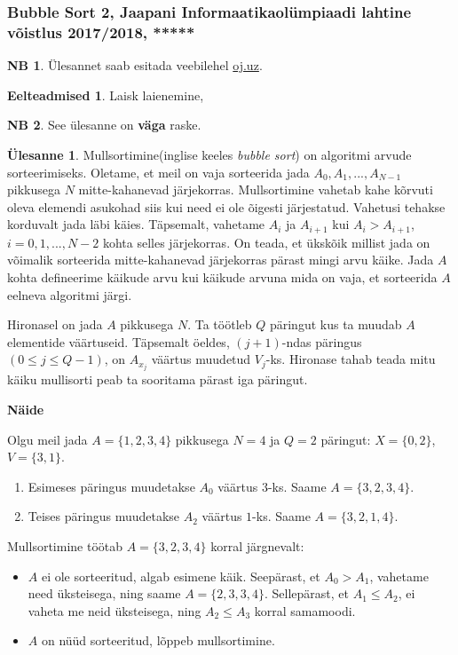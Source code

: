 \documentclass{trkut}
\theoremstyle{definition}
\newtheorem*{prereq}{Eelteadmised}
\newtheorem*{extra}{NB}
\newtheorem*{Text}{Ülesanne}
\begin{document}
\subsubsection{Bubble Sort 2, Jaapani Informaatikaolümpiaadi lahtine võistlus 2017/2018,  *****}
\begin{extra}
Ülesannet saab esitada veebilehel \href{https://oj.uz/problem/view/JOI18_bubblesort2}{oj.uz}.
\end{extra}
\begin{prereq}
Laisk laienemine,
\end{prereq}
\begin{extra}
See ülesanne on \textbf{väga} raske.
\end{extra}
\begin{Text}
Mullsortimine(inglise keeles \textit{bubble sort}) on algoritmi arvude sorteerimiseks. Oletame, et meil on vaja sorteerida jada $A_0,A_1,...,A_{N-1}$ pikkusega $N$ mitte-kahanevad järjekorras. Mullsortimine vahetab kahe kõrvuti oleva elemendi asukohad siis kui need ei ole õigesti järjestatud. Vahetusi tehakse korduvalt jada läbi käies. Täpsemalt, vahetame $A_i$ ja $A_{i+1}$ kui $A_i>A_{i+1}$, $i=0,1,...,N-2$ kohta selles järjekorras. On teada, et ükskõik millist jada on võimalik sorteerida mitte-kahanevad järjekorras pärast mingi arvu käike. Jada $A$ kohta defineerime käikude arvu kui käikude arvuna mida on vaja, et sorteerida $A$ eelneva algoritmi järgi.

Hironasel on jada $A$ pikkusega $N$. Ta töötleb $Q$ päringut kus ta muudab $A$ elementide väärtuseid. Täpsemalt öeldes, $(j+1)$-ndas päringus$(0\le j\le Q-1)$, on $A_{x_j}$ väärtus muudetud $V_j$-ks.
Hironase tahab teada mitu käiku mullisorti peab ta sooritama pärast iga päringut.

\textbf{Näide}

Olgu meil jada $A=\{1,2,3,4\}$ pikkusega $N=4$ ja $Q=2$ päringut: $X=\{0,2\}$, $V=\{3,1\}$.
\begin{enumerate}
    \item Esimeses päringus muudetakse $A_0$ väärtus $3$-ks. Saame $A=\{3,2,3,4\}$.
    \item Teises päringus muudetakse $A_2$ väärtus $1$-ks. Saame $A=\{3,2,1,4\}$.
\end{enumerate}

Mullsortimine töötab $A=\{3,2,3,4\}$ korral järgnevalt:
\begin{itemize}
    \item $A$ ei ole sorteeritud, algab esimene käik. Seepärast, et $A_0>A_1$, vahetame need üksteisega, ning saame $A=\{2,3,3,4\}$. Sellepärast, et $A_1\le A_2$, ei vaheta me neid üksteisega, ning $A_2\le A_3$ korral samamoodi.
    \item $A$ on nüüd sorteeritud, lõppeb mullsortimine.
\end{itemize}


\end{Text}
\end{document}
